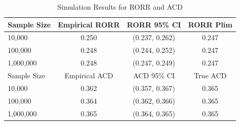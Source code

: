 \documentclass{article}
\begin{document}
\begin{table}[ht]
\centering
\caption{Simulation Results for RORR and ACD}
\begin{tabular}{lccc}
\toprule
Sample Size & Empirical RORR & RORR 95\% CI & RORR Plim \\
\midrule
10,000 & 0.250 & (0.237, 0.262) & 0.247 \\
100,000 & 0.248 & (0.244, 0.252) & 0.247 \\
1,000,000 & 0.248 & (0.247, 0.249) & 0.247 \\
\midrule
Sample Size & Empirical ACD & ACD 95\% CI & True ACD \\
\midrule
10,000 & 0.362 & (0.357, 0.367) & 0.365 \\
100,000 & 0.364 & (0.362, 0.366) & 0.365 \\
1,000,000 & 0.365 & (0.364, 0.365) & 0.365 \\
\bottomrule
\end{tabular}
\end{table}
\end{document}
